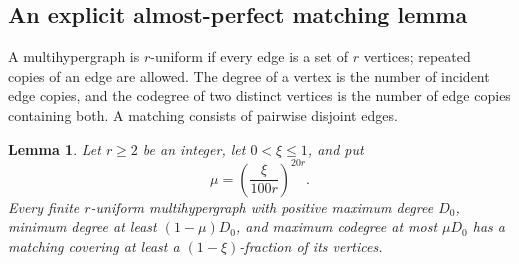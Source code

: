 \documentclass[11pt]{article}
\newtheorem{lemma}[theorem]{Lemma}
\begin{document}
\subsection{An explicit almost-perfect matching lemma}

A multihypergraph is $r$-uniform if every edge is a set of $r$ vertices; repeated copies
 of an edge are allowed. The degree of a vertex is the number of incident edge copies,
 and the codegree of two distinct vertices is the number of edge copies containing both.
 A matching consists of pairwise disjoint edges.

\begin{lemma}\label{lem:matching}
Let $r\ge2$ be an integer, let $0<\xi\le1$, and put
\[
 \mu=\left(\frac{\xi}{100r}\right)^{20r}.
\]
Every finite $r$-uniform multihypergraph with positive maximum degree $D_0$, minimum
 degree at least $(1-\mu)D_0$, and maximum codegree at most $\mu D_0$ has a matching
 covering at least a $(1-\xi)$-fraction of its vertices.
\end{lemma}
\end{document}
